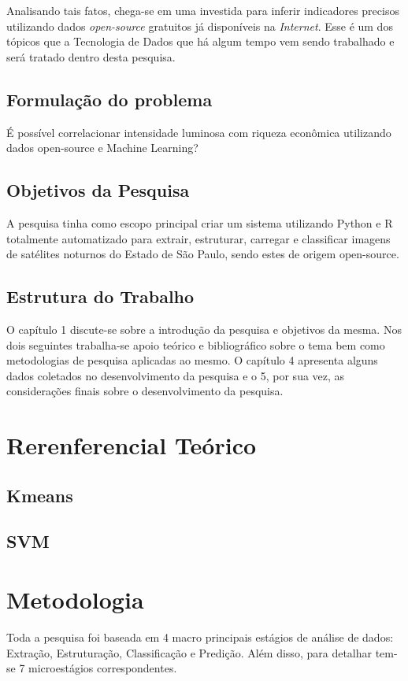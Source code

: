 \documentclass[]{article}
\begin{document}
Analisando tais fatos, chega-se em uma investida para inferir indicadores precisos utilizando dados \textit{open-source} gratuitos já disponíveis na \textit{Internet}. Esse é um dos tópicos que a Tecnologia de Dados que há algum tempo vem sendo trabalhado e será tratado dentro desta pesquisa.

\subsection{Formulação do problema}
É possível correlacionar intensidade luminosa com riqueza econômica utilizando dados open-source e Machine Learning?

\subsection{Objetivos da Pesquisa}
A pesquisa tinha como escopo principal criar um sistema utilizando Python e R totalmente automatizado para extrair, estruturar, carregar e classificar imagens de satélites noturnos do Estado de São Paulo, sendo estes de origem open-source.

\subsection{Estrutura do Trabalho}
O capítulo 1 discute-se sobre a introdução da pesquisa e objetivos da mesma. Nos dois seguintes trabalha-se apoio teórico e bibliográfico sobre o tema bem como metodologias de pesquisa aplicadas ao mesmo. O capítulo 4 apresenta alguns dados coletados no desenvolvimento da pesquisa e o 5, por sua vez, as considerações finais sobre o desenvolvimento da pesquisa.

\section{Rerenferencial Teórico}
\label{s.referencia_teorico}

\subsection{Kmeans}

\subsection{SVM}

\section{Metodologia}
Toda a pesquisa foi baseada em 4 macro principais estágios de análise de dados: Extração, Estruturação, Classificação e Predição. Além disso, para detalhar tem-se 7 microestágios correspondentes.
\end{document}
